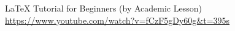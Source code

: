 LaTeX Tutorial for Beginners (by Academic Lesson)
\url{https://www.youtube.com/watch?v=fCzF5gDy60g&t=395s}